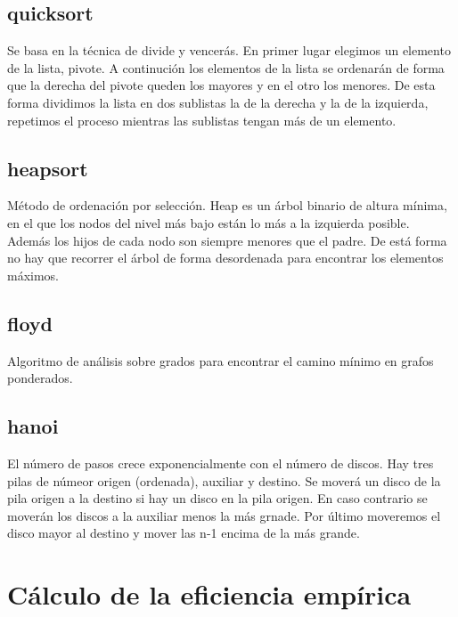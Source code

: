 \documentclass[11pt]{article}
\begin{document}
\subsection*{quicksort}
Se basa en la técnica de divide y vencerás.
En primer lugar elegimos un elemento de la lista, pivote. A continución los elementos de la lista se ordenarán de forma que la derecha del pivote queden los mayores y en el otro los menores. De esta forma dividimos la lista en dos sublistas la de la derecha y la de la izquierda, repetimos el proceso mientras las sublistas tengan más de un elemento.

\subsection*{heapsort}
Método de ordenación por selección.
Heap es un árbol binario de altura mínima, en el que los nodos del nivel más bajo están lo más a la izquierda posible. Además los hijos de cada nodo son siempre menores que el padre. De está forma no hay que recorrer el árbol de forma desordenada para encontrar los elementos máximos.

\subsection*{floyd}
Algoritmo de análisis sobre grados para encontrar el camino mínimo en grafos ponderados.

\subsection*{hanoi}
El número de pasos crece exponencialmente con el número de discos. Hay tres pilas de númeor origen (ordenada), auxiliar y destino. Se moverá un disco de la pila origen a la destino si hay un disco en la pila origen. En caso contrario se moverán los discos a la auxiliar menos la más grnade.
Por último moveremos el disco mayor al destino y mover las n-1 encima de la más grande.

\section*{Cálculo de la eficiencia empírica}


\begin{center}
	
\end{center}



\begin{center}
	
\end{center}
\end{document}
